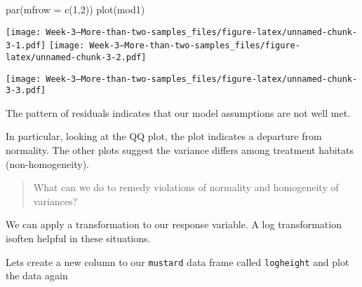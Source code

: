 \documentclass[
]{article}
\newenvironment{Shaded}{\begin{snugshade}}{\end{snugshade}}
\newcommand{\AttributeTok}[1]{\textcolor[rgb]{0.77,0.63,0.00}{#1}}
\newcommand{\DecValTok}[1]{\textcolor[rgb]{0.00,0.00,0.81}{#1}}
\newcommand{\FloatTok}[1]{\textcolor[rgb]{0.00,0.00,0.81}{#1}}
\newcommand{\FunctionTok}[1]{\textcolor[rgb]{0.00,0.00,0.00}{#1}}
\newcommand{\NormalTok}[1]{#1}
\newcommand{\SpecialCharTok}[1]{\textcolor[rgb]{0.00,0.00,0.00}{#1}}
\newcommand{\StringTok}[1]{\textcolor[rgb]{0.31,0.60,0.02}{#1}}
\begin{document}
\begin{Shaded}
\begin{Highlighting}[]
\FunctionTok{par}\NormalTok{(}\AttributeTok{mfrow =} \FunctionTok{c}\NormalTok{(}\DecValTok{1}\NormalTok{,}\DecValTok{2}\NormalTok{))}
\FunctionTok{plot}\NormalTok{(mod1)}
\end{Highlighting}
\end{Shaded}

\texttt{[image: Week-3---More-than-two-samples\_files/figure-latex/unnamed-chunk-3-1.pdf]}
\texttt{[image: Week-3---More-than-two-samples\_files/figure-latex/unnamed-chunk-3-2.pdf]}

\begin{Shaded}
\end{Shaded}

\texttt{[image: Week-3---More-than-two-samples\_files/figure-latex/unnamed-chunk-3-3.pdf]}

The pattern of residuals indicates that our model assumptions are not
well met.

In particular, looking at the QQ plot, the plot indicates a departure
from normality. The other plots suggest the variance differs among
treatment habitats (non-homogeneity).

\begin{quote}
What can we do to remedy violations of normality and homogeneity of
variances?
\end{quote}

We can apply a transformation to our response variable. A log
transformation isoften helpful in these situations.

Lets create a new column to our \texttt{mustard} data frame called
\texttt{logheight} and plot the data again
\end{document}

